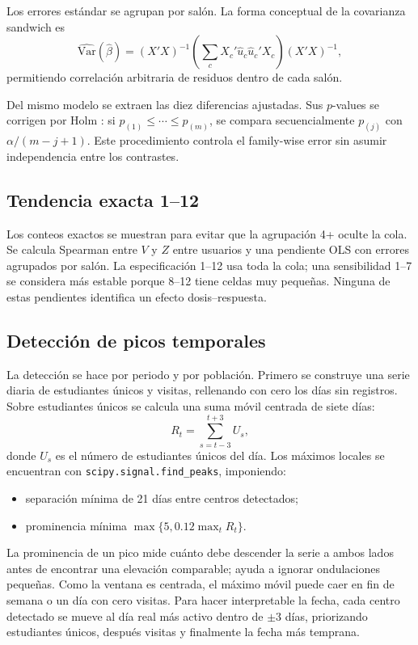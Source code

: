 \documentclass[11pt,letterpaper]{article}
\newcommand{\code}[1]{\texttt{#1}}
\begin{document}
Los errores estándar se agrupan por salón. La forma conceptual de la covarianza sandwich es \citep{cameronmiller2015}
\[
\widehat{\mathrm{Var}}(\widehat\beta)=
(X'X)^{-1}
\left(\sum_cX_c'\widehat u_c\widehat u_c'X_c\right)
(X'X)^{-1},
\]
permitiendo correlación arbitraria de residuos dentro de cada salón.

Del mismo modelo se extraen las diez diferencias ajustadas. Sus $p$-values se corrigen por Holm \citep{holm1979}: si $p_{(1)}\le\cdots\le p_{(m)}$, se compara secuencialmente $p_{(j)}$ con $\alpha/(m-j+1)$. Este procedimiento controla el family-wise error sin asumir independencia entre los contrastes.

\subsection{Tendencia exacta 1--12}

Los conteos exactos se muestran para evitar que la agrupación 4+ oculte la cola. Se calcula Spearman entre $V$ y $Z$ entre usuarios y una pendiente OLS con errores agrupados por salón. La especificación 1--12 usa toda la cola; una sensibilidad 1--7 se considera más estable porque 8--12 tiene celdas muy pequeñas. Ninguna de estas pendientes identifica un efecto dosis--respuesta.

\subsection{Detección de picos temporales}

La detección se hace por periodo y por población. Primero se construye una serie diaria de estudiantes únicos y visitas, rellenando con cero los días sin registros. Sobre estudiantes únicos se calcula una suma móvil centrada de siete días:
\[
R_t=\sum_{s=t-3}^{t+3}U_s,
\]
donde $U_s$ es el número de estudiantes únicos del día. Los máximos locales se encuentran con \code{scipy.signal.find\_peaks}, imponiendo:
\begin{itemize}[leftmargin=*]
\item separación mínima de 21 días entre centros detectados;
\item prominencia mínima $\max\{5,0.12\max_t R_t\}$.
\end{itemize}
La prominencia de un pico mide cuánto debe descender la serie a ambos lados antes de encontrar una elevación comparable; ayuda a ignorar ondulaciones pequeñas. Como la ventana es centrada, el máximo móvil puede caer en fin de semana o un día con cero visitas. Para hacer interpretable la fecha, cada centro detectado se mueve al día real más activo dentro de $\pm3$ días, priorizando estudiantes únicos, después visitas y finalmente la fecha más temprana.
\end{document}
